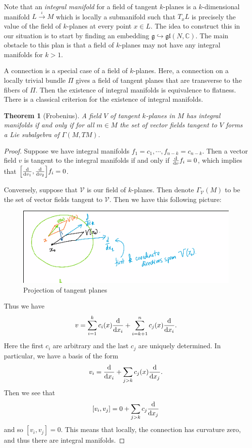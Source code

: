\documentclass[leqno, openany]{memoir}
\newtheorem{thm}{Theorem}[section]
\theoremstyle{definition}
\theoremstyle{remark}
\theoremstyle{plain}
\theoremstyle{definition}
\theoremstyle{remark}
\newcommand{\C}{\mathbb{C}}
\newcommand{\mc}[1]{\mathcal{#1}}
\newcommand{\mf}[1]{\mathfrak{#1}}
\begin{document}
Note that an \textit{integral manifold} for a field of tangent $k$-planes is a $k$-dimensional manifold $L \xrightarrow{\iota} M$ which is locally a submanifold such that $T_xL$ is precisely the value of the field of $k$-planes at every point $x \in L$. The idea to construct this in our situation is to start by finding an embedding $\mf{g} \hookrightarrow \mf{gl}(N, \C)$. The main obstacle to this plan is that a field of $k$-planes may not have any integral manifolds for $k > 1$. 

A connection is a special case of a field of $k$-planes. Here, a connection on a locally trivial bundle $\Pi$ gives a field of tangent planes that are transverse to the fibers of $\Pi$. Then the existence of integral manifolds is equivalence to flatness. There is a classical criterion for the existence of integral manifolds.

\begin{thm}[Frobenius]
    A field $V$ of tangent $k$-planes in $M$ has integral manifolds if and only if for all $m \in M$ the set of vector fields tangent to $V$ forms a Lie subalgebra of $\Gamma(M, TM)$.
\end{thm}

\begin{proof}
Suppose we have integral manifolds $f_1 = c_1, \cdots, f_{n-k} = c_{n-k}$. Then a vector field $v$ is tangent to the integral manifolds if and only if $\dv{v} f_i = 0$, which implies that $\qty[ \dv{v_1}, \dv{v_2} ] f_i = 0$.

Conversely, suppose that $\mc{V}$ is our field of $k$-planes. Then denote $\Gamma_{\mc{V}}(M)$ to be the set of vector fields tangent to $\mc{V}$. Then we have this following picture:
\begin{figure}[H]
    \centering
    \includegraphics[width=0.8\linewidth]{frob}
    \caption{Projection of tangent planes}%
    \label{fig:frob}
\end{figure}
Thus we have
\[ v = \sum_{i=1}^k c_i(x) \dv{x_i} + \sum_{i=k+1}^n c_j(x) \dv{x_i}. \]
Here the first $c_i$ are arbitrary and the last $c_j$ are uniquely determined. In particular, we have a basis of the form 
\[ v_i = \dv{x_i} + \sum_{j > k} c_j(x) \dv{x_j}. \] Then we see that
\[ [v_i, v_j] = 0 + \sum_{j>k} c_j \dv{x_j} \]
and so $[v_i, v_j] = 0$. This means that locally, the connection has curvature zero, and thus there are integral manifolds.
\end{proof}
\end{document}

